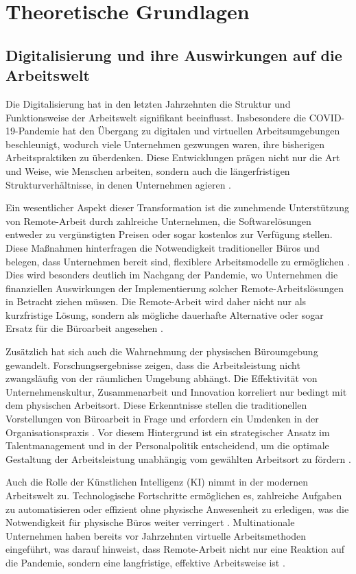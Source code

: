 \section{Theoretische Grundlagen}

\subsection{Digitalisierung und ihre Auswirkungen auf die Arbeitswelt}

Die Digitalisierung hat in den letzten Jahrzehnten die Struktur und Funktionsweise der Arbeitswelt signifikant beeinflusst. Insbesondere die COVID-19-Pandemie hat den Übergang zu digitalen und virtuellen Arbeitsumgebungen beschleunigt, wodurch viele Unternehmen gezwungen waren, ihre bisherigen Arbeitspraktiken zu überdenken. Diese Entwicklungen prägen nicht nur die Art und Weise, wie Menschen arbeiten, sondern auch die längerfristigen Strukturverhältnisse, in denen Unternehmen agieren \cite{file2}.

Ein wesentlicher Aspekt dieser Transformation ist die zunehmende Unterstützung von Remote-Arbeit durch zahlreiche Unternehmen, die Softwarelösungen entweder zu vergünstigten Preisen oder sogar kostenlos zur Verfügung stellen. Diese Maßnahmen hinterfragen die Notwendigkeit traditioneller Büros und belegen, dass Unternehmen bereit sind, flexiblere Arbeitsmodelle zu ermöglichen \cite{file2}. Dies wird besonders deutlich im Nachgang der Pandemie, wo Unternehmen die finanziellen Auswirkungen der Implementierung solcher Remote-Arbeitslösungen in Betracht ziehen müssen. Die Remote-Arbeit wird daher nicht nur als kurzfristige Lösung, sondern als mögliche dauerhafte Alternative oder sogar Ersatz für die Büroarbeit angesehen \cite{file2}.

Zusätzlich hat sich auch die Wahrnehmung der physischen Büroumgebung gewandelt. Forschungsergebnisse zeigen, dass die Arbeitsleistung nicht zwangsläufig von der räumlichen Umgebung abhängt. Die Effektivität von Unternehmenskultur, Zusammenarbeit und Innovation korreliert nur bedingt mit dem physischen Arbeitsort. Diese Erkenntnisse stellen die traditionellen Vorstellungen von Büroarbeit in Frage und erfordern ein Umdenken in der Organisationspraxis \cite{file2}. Vor diesem Hintergrund ist ein strategischer Ansatz im Talentmanagement und in der Personalpolitik entscheidend, um die optimale Gestaltung der Arbeitsleistung unabhängig vom gewählten Arbeitsort zu fördern \cite{file2}.

Auch die Rolle der Künstlichen Intelligenz (KI) nimmt in der modernen Arbeitswelt zu. Technologische Fortschritte ermöglichen es, zahlreiche Aufgaben zu automatisieren oder effizient ohne physische Anwesenheit zu erledigen, was die Notwendigkeit für physische Büros weiter verringert \cite{7}. Multinationale Unternehmen haben bereits vor Jahrzehnten virtuelle Arbeitsmethoden eingeführt, was darauf hinweist, dass Remote-Arbeit nicht nur eine Reaktion auf die Pandemie, sondern eine langfristige, effektive Arbeitsweise ist \cite{7}.

